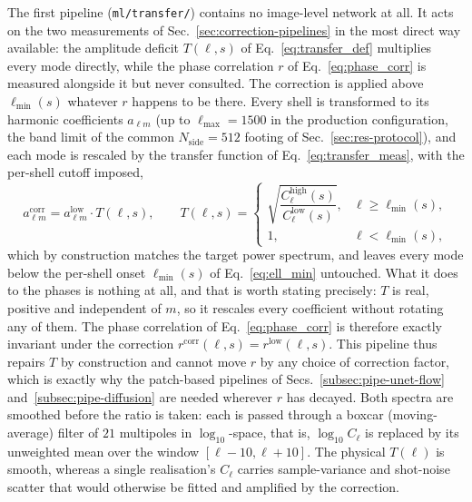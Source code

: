 \documentclass{report}
\begin{document}
The first pipeline (\texttt{ml/transfer/}) contains no image-level network at all. It acts on the two measurements of Sec.~\ref{sec:correction-pipelines} in the most direct way available: the amplitude deficit \mbox{$T(\ell, s)$} of Eq.~\eqref{eq:transfer_def} multiplies every mode directly, while the phase correlation \mbox{$r$} of Eq.~\eqref{eq:phase_corr} is measured alongside it but never consulted. The correction is applied above \mbox{$\ell_{\min}(s)$} whatever \mbox{$r$} happens to be there. Every shell is transformed to its harmonic coefficients $a_{\ell m}$ (up to \mbox{$\ell_{\max}=1500$} in the production configuration, the band limit of the common \mbox{$N_{\mathrm{side}}=512$} footing of Sec.~\ref{sec:res-protocol}), and each mode is rescaled by the transfer function of Eq.~\eqref{eq:transfer_meas}, with the per-shell cutoff imposed,
\begin{equation}
  a_{\ell m}^{\mathrm{corr}} = a_{\ell m}^{\mathrm{low}} \cdot T(\ell, s),
  \qquad
  T(\ell, s) =
  \begin{cases}
    \sqrt{\dfrac{ C_\ell^{\mathrm{high}}(s)}{C_\ell^{\mathrm{low}}(s)}}, & \ell \ge \ell_{\min}(s),\\[2mm]
    1, & \ell < \ell_{\min}(s),
  \end{cases}
  \label{eq:transfer_def}
\end{equation}
which by construction matches the target power spectrum, and leaves every mode below the per-shell onset $\ell_{\min}(s)$ of Eq.~\eqref{eq:ell_min} untouched. What it does to the phases is nothing at all, and that is worth stating precisely: \mbox{$T$} is real, positive and independent of \mbox{$m$}, so it rescales every coefficient without rotating any of them. The phase correlation of Eq.~\eqref{eq:phase_corr} is therefore exactly invariant under the correction \mbox{$r^{\mathrm{corr}}(\ell,s) = r^{\mathrm{low}}(\ell,s)$}. This pipeline thus repairs \mbox{$T$} by construction and cannot move \mbox{$r$} by any choice of correction factor, which is exactly why the patch-based pipelines of Secs.~\ref{subsec:pipe-unet-flow} and~\ref{subsec:pipe-diffusion} are needed wherever \mbox{$r$} has decayed. Both spectra are smoothed before the ratio is taken: each is passed through a boxcar (moving-average) filter \cite{smith_chapter_2003} of \mbox{$21$} multipoles in \mbox{$\log_{10}$}-space, that is, \mbox{$\log_{10} C_\ell$} is replaced by its unweighted mean over the window \mbox{$[\ell-10, \ell+10]$}. The physical \mbox{$T(\ell)$} is smooth, whereas a single realisation's \mbox{$C_\ell$} carries sample-variance and shot-noise scatter that would otherwise be fitted and amplified by the correction.
\end{document}
